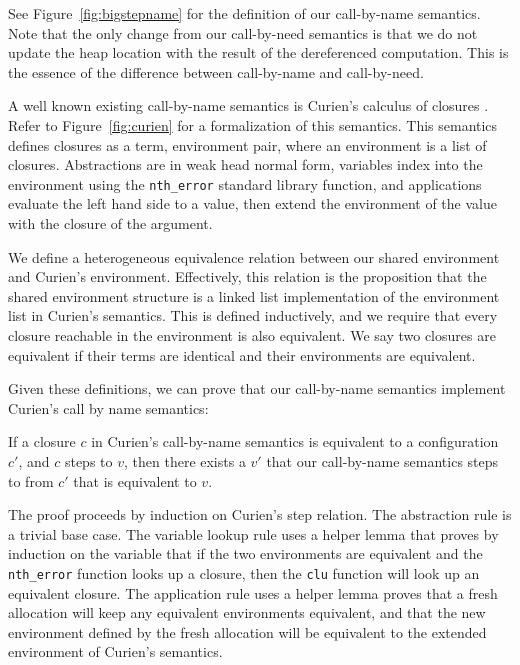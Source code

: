 See Figure~\ref{fig:bigstepname} for the definition of our call-by-name
semantics. Note that the only change from our call-by-need semantics is that we
do not update the heap location with the result of the dereferenced computation.
This is the essence of the difference between call-by-name and call-by-need.

A well known existing call-by-name semantics is Curien's calculus of closures
\cite{curien1991abstract}. Refer to Figure~\ref{fig:curien} for a formalization of this
semantics. This semantics defines closures as a term, environment pair, where an
environment is a list of closures. Abstractions are in weak head normal form,
variables index into the environment using the \texttt{nth\_error} standard
library function, and applications evaluate the left hand side to a value, then
extend the environment of the value with the closure of the argument. 

We define a heterogeneous equivalence relation between our shared environment
and Curien's environment. Effectively, this relation is the proposition that
the shared environment structure is a linked list implementation of the
environment list in Curien's semantics. This is defined inductively, and we
require that every closure reachable in the environment is also equivalent.  We
say two closures are equivalent if their terms are identical and their
environments are equivalent. 

Given these definitions, we can prove that our call-by-name semantics implement
Curien's call by name semantics: 

\begin{theorem}
If a closure $c$ in Curien's call-by-name semantics is equivalent to a
configuration $c'$, and $c$ steps to $v$, then there exists a $v'$ that our
call-by-name semantics steps to from $c'$ that is equivalent to $v$.
\end{theorem}
\begin{proofoutline}
The proof proceeds by induction on Curien's step relation. The abstraction rule
is a trivial base case. The variable lookup rule uses a helper lemma that proves
by induction on the variable that if the two environments are equivalent and the
\texttt{nth\_error} function looks up a closure, then the \texttt{clu} function
will look up an equivalent closure. The application rule uses a helper lemma
proves that a fresh allocation will keep any equivalent environments equivalent,
and that the new environment defined by the fresh allocation will be equivalent
to the extended environment of Curien's semantics.
\end{proofoutline}

